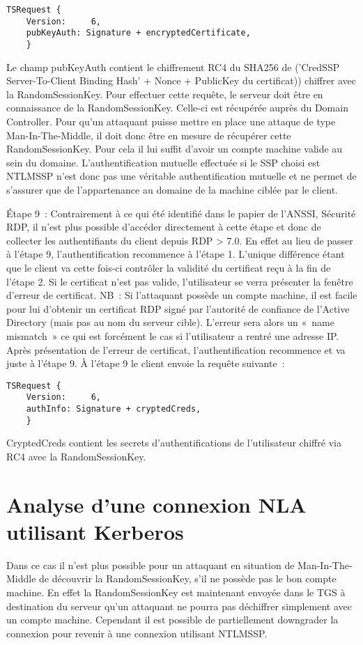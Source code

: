 \begin{lstlisting}[frame=single,basicstyle=\tiny]
TSRequest {
	Version:     6,
	pubKeyAuth: Signature + encryptedCertificate,
	}
\end{lstlisting}

Le champ pubKeyAuth contient le chiffrement RC4 du SHA256 de (’CredSSP Server-To-Client Binding Hash’ + Nonce + PublicKey du certificat)) chiffrer avec la RandomSessionKey.
Pour effectuer cette requête, le serveur doit être en connaissance de la RandomSessionKey. Celle-ci est récupérée auprès du Domain Controller. Pour qu’un attaquant puisse mettre en place une attaque de type Man-In-The-Middle, il doit donc être en mesure de récupérer cette RandomSessionKey. Pour cela il lui suffit d’avoir un compte machine valide au sein du domaine.
L’authentification mutuelle effectuée si le SSP choisi est NTLMSSP n’est donc pas une véritable authentification mutuelle et ne permet de s'assurer que de l'appartenance au domaine de la machine ciblée par le client.

Étape 9 :
Contrairement à ce qui été identifié dans le papier de l’ANSSI, Sécurité RDP, il n’est plus possible d’accéder directement à cette étape et donc de collecter les authentifiants du client depuis RDP > 7.0.
En effet au lieu de passer à l’étape 9, l’authentification recommence à l’étape 1. L'unique différence étant que le client va cette fois-ci contrôler la validité du certificat reçu à la fin de l’étape 2. Si le certificat n'est pas valide, l'utilisateur se verra présenter la fenêtre d'erreur de certificat.
NB : Si l’attaquant possède un compte machine, il est facile pour lui d’obtenir un certificat RDP signé par l’autorité de confiance de l’Active Directory (mais pas au nom du serveur cible). L’erreur sera alors un « name mismatch » ce qui est forcément le cas si l’utilisateur a rentré une adresse IP.
Après présentation de l’erreur de certificat, l’authentification recommence et va juste à l’étape 9.
À l’étape 9 le client envoie la requête suivante :

\begin{lstlisting}[frame=single,basicstyle=\tiny]
TSRequest {
	Version:     6,
	authInfo: Signature + cryptedCreds,
	}
\end{lstlisting}


CryptedCreds contient les secrets d’authentifications de l’utilisateur chiffré via RC4 avec la RandomSessionKey.

\section{Analyse d'une connexion NLA utilisant Kerberos}
Dans ce cas il n’est plus possible pour un attaquant en situation de Man-In-The-Middle de découvrir la RandomSessionKey, s’il ne possède pas le bon compte machine. En effet la RandomSessionKey est maintenant envoyée dans le TGS à destination du serveur qu’un attaquant ne pourra pas déchiffrer simplement avec un compte machine.
Cependant il est possible de partiellement downgrader la connexion pour revenir à une connexion utilisant NTLMSSP.

